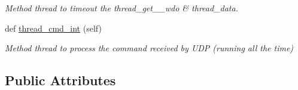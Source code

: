 \begin{DoxyCompactItemize}
\begin{DoxyCompactList}\small\item\em Method thread to timeout the thread\+\_\+get\+\_\+\_\+wdo \& thread\+\_\+data. \end{DoxyCompactList}\item 
def \mbox{\hyperlink{classwatchman_1_1_watchman__main__window_a05f6463320989b4c77eced835775d8ad}{thread\+\_\+cmd\+\_\+int}} (self)
\begin{DoxyCompactList}\small\item\em Method thread to process the command received by U\+DP (running all the time) \end{DoxyCompactList}\end{DoxyCompactItemize}
\subsection*{Public Attributes}
